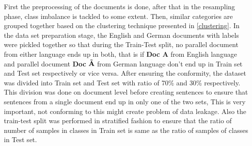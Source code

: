 First the preprocessing of the documents is done, after that in the resampling phase, class imbalance is tackled to some extent. Then, similar categories are grouped together based on the clustering technique presented in \ref{clustering}. In the data set preparation stage, the English and German documents with labels were pickled together so that during the Train-Test split, no parallel document from either language ends up in both, that is if \textbf{Doc A} from English language and parallel document \textbf{Doc} $\mathbf{\Tilde{A}}$ from German language don't end up in Train set and Test set respectively or vice versa. After ensuring the conformity, the dataset was divided into Train set and Test set with ratio of 70\% and 30\% respectively. This division was done on document level before creating sentences to ensure that sentences from a single document end up in only one of the two sets, This is very important, not conforming to this might create problem of data leakage. Also the train-test split was performed in stratified fashion to ensure that the ratio of number of samples in classes in Train set is same as the ratio of samples of classes in Test set.
















